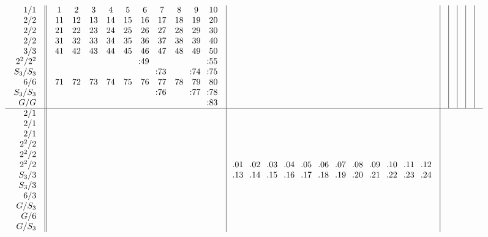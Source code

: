 \documentclass[12pt,a4paper]{amsart}
\begin{document}
\newpage
\scriptsize {}
\begin{align*}
  \begin{array}{r||c|c|c|c|c|c|c}
    \begin{array}{r}
      1/1 \\ 2/2 \\ 2/2 \\ 2/2 \\ 3/3 \\ 2^2/2^2 \\ S_3/S_3 \\ 6/6 \\ S_3/S_3 \\ G/G
    \end{array}
    &
    \begin{array}{cccccccccc}
1&2&3&4&5&6&7&8&9&10\\
11&12&13&14&15&16&17&18&19&20\\
21&22&23&24&25&26&27&28&29&30\\
31&32&33&34&35&36&37&38&39&40\\
41&42&43&44&45&46&47&48&49&50\\
&&&&&\llap:49&&&&\llap:55\\
&&&&&&\llap:73&&\llap:74&\llap:75\\
71&72&73&74&75&76&77&78&79&80\\
&&&&&&\llap:76&&\llap:77&\llap:78\\
&&&&&&&&&\llap:83\\
    \end{array}
&&&&&&\\\hline
    \begin{array}{r}
      2/1 \\ 2/1 \\ 2/1 \\ 2^2/2 \\ 2^2/2 \\ 2^2/2 \\ S_3/3 \\ S_3/3 \\ 6/3 \\ G/S_3 \\ G/6 \\ G/S_3
    \end{array}
&
&
  \begin{array}{cccccccccccc}
\llap{.}01&\llap{.}02&\llap{.}03&\llap{.}04&\llap{.}05&\llap{.}06&\llap{.}07&\llap{.}08&\llap{.}09&\llap{.}10&\llap{.}11&\llap{.}12\\
\llap{.}13&\llap{.}14&\llap{.}15&\llap{.}16&\llap{.}17&\llap{.}18&\llap{.}19&\llap{.}20&\llap{.}21&\llap{.}22&\llap{.}23&\llap{.}24\\

\end{array}
\end{array}
\end{align*}
\end{document}
